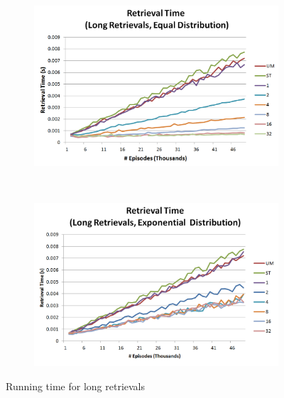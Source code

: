 \documentclass[11pt]{article} %
\begin{document}
\begin{figure}
        \centering
        \begin{subfigure}[b]{0.55\textwidth}
                \centering
                \includegraphics[width=\textwidth]{images/ret_worst_eq}
                \label{fig:retleq}
        \end{subfigure}%
        ~ %
        \begin{subfigure}[b]{0.55\textwidth}
                \centering
                \includegraphics[width=\textwidth]{images/ret_long_exp}
                \label{fig:retlexp}
        \end{subfigure}
        \caption{Running time for long retrievals}\label{fig:animals}
	\label{fig:long}
\end{figure}
\end{document}
